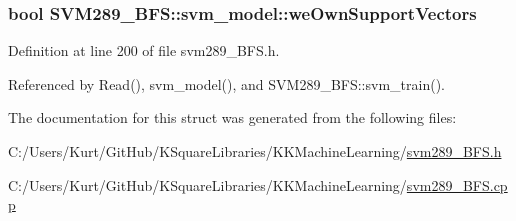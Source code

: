 \subsubsection[{\texorpdfstring{we\+Own\+Support\+Vectors}{weOwnSupportVectors}}]{\setlength{\rightskip}{0pt plus 5cm}bool S\+V\+M289\+\_\+\+B\+F\+S\+::svm\+\_\+model\+::we\+Own\+Support\+Vectors}\hypertarget{struct_s_v_m289___b_f_s_1_1svm__model_ab9180dbd9f7c9efcc1e95e543a908afe}{}\label{struct_s_v_m289___b_f_s_1_1svm__model_ab9180dbd9f7c9efcc1e95e543a908afe}


Definition at line 200 of file svm289\+\_\+\+B\+F\+S.\+h.



Referenced by Read(), svm\+\_\+model(), and S\+V\+M289\+\_\+\+B\+F\+S\+::svm\+\_\+train().



The documentation for this struct was generated from the following files\+:\begin{DoxyCompactItemize}
\item 
C\+:/\+Users/\+Kurt/\+Git\+Hub/\+K\+Square\+Libraries/\+K\+K\+Machine\+Learning/\hyperlink{svm289___b_f_s_8h}{svm289\+\_\+\+B\+F\+S.\+h}\item 
C\+:/\+Users/\+Kurt/\+Git\+Hub/\+K\+Square\+Libraries/\+K\+K\+Machine\+Learning/\hyperlink{svm289___b_f_s_8cpp}{svm289\+\_\+\+B\+F\+S.\+cpp}\end{DoxyCompactItemize}
